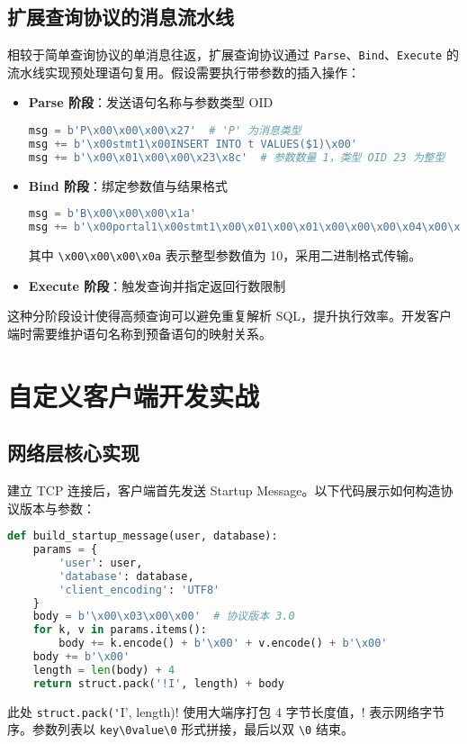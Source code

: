 \section{扩展查询协议的消息流水线}
相较于简单查询协议的单消息往返，扩展查询协议通过 \verb!Parse!、\verb!Bind!、\verb!Execute! 的流水线实现预处理语句复用。假设需要执行带参数的插入操作：\par
\begin{itemize}
\item \textbf{Parse 阶段}：发送语句名称与参数类型 OID\begin{lstlisting}[language=python]
msg = b'P\x00\x00\x00\x27'  # 'P' 为消息类型
msg += b'\x00stmt1\x00INSERT INTO t VALUES($1)\x00'
msg += b'\x00\x01\x00\x00\x23\x8c'  # 参数数量 1，类型 OID 23 为整型
\end{lstlisting}

\item \textbf{Bind 阶段}：绑定参数值与结果格式\begin{lstlisting}[language=python]
msg = b'B\x00\x00\x00\x1a'
msg += b'\x00portal1\x00stmt1\x00\x01\x00\x01\x00\x00\x00\x04\x00\x00\x00\x0a'
\end{lstlisting}
其中 \verb!\x00\x00\x00\x0a! 表示整型参数值为 10，采用二进制格式传输。
\item \textbf{Execute 阶段}：触发查询并指定返回行数限制
\end{itemize}
这种分阶段设计使得高频查询可以避免重复解析 SQL，提升执行效率。开发客户端时需要维护语句名称到预备语句的映射关系。\par
\chapter{自定义客户端开发实战}
\section{网络层核心实现}
建立 TCP 连接后，客户端首先发送 Startup Message。以下代码展示如何构造协议版本与参数：\par
\begin{lstlisting}[language=python]
def build_startup_message(user, database):
    params = {
        'user': user,
        'database': database,
        'client_encoding': 'UTF8'
    }
    body = b'\x00\x03\x00\x00'  # 协议版本 3.0
    for k, v in params.items():
        body += k.encode() + b'\x00' + v.encode() + b'\x00'
    body += b'\x00'
    length = len(body) + 4
    return struct.pack('!I', length) + body
\end{lstlisting}
此处 \verb!struct.pack('!I', length)! 使用大端序打包 4 字节长度值，\verb!!! 表示网络字节序。参数列表以 \verb!key\0value\0! 形式拼接，最后以双 \verb!\0! 结束。\par
